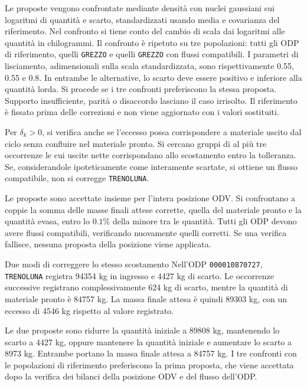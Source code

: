 Le proposte vengono confrontate mediante densità con nuclei gaussiani sui logaritmi di quantità e scarto, standardizzati usando media e covarianza del riferimento. Nel confronto si tiene conto del cambio di scala dai logaritmi alle quantità in chilogrammi. Il confronto è ripetuto su tre popolazioni: tutti gli ODP di riferimento, quelli \texttt{GREZZO} e quelli \texttt{GREZZO} con flussi compatibili. I parametri di lisciamento, adimensionali sulla scala standardizzata, sono rispettivamente \num{0.55}, \num{0.55} e \num{0.8}. In entrambe le alternative, lo scarto deve essere positivo e inferiore alla quantità lorda. Si procede se i tre confronti preferiscono la stessa proposta. Supporto insufficiente, parità o disaccordo lasciano il caso irrisolto. Il riferimento è fissato prima delle correzioni e non viene aggiornato con i valori sostituiti.

Per $\delta_k>0$, si verifica anche se l'eccesso possa corrispondere a materiale uscito dal ciclo senza confluire nel materiale pronto. Si cercano gruppi di al più tre occorrenze le cui uscite nette corrispondano allo scostamento entro la tolleranza. Se, considerandole ipoteticamente come interamente scartate, si ottiene un flusso compatibile, non si corregge \texttt{TRENOLUNA}.

Le proposte sono accettate insieme per l'intera posizione ODV. Si confrontano a coppie la somma delle masse finali attese corrette, quella del materiale pronto e la quantità evasa, entro lo $0.1\%$ della minore tra le quantità. Tutti gli ODP devono avere flussi compatibili, verificando nuovamente quelli corretti. Se una verifica fallisce, nessuna proposta della posizione viene applicata.

\begingroup
{}
\begin{examplebox}{Due modi di correggere lo stesso scostamento}
Nell'ODP \texttt{000010870727}, \texttt{TRENOLUNA} registra \num{94354} kg in ingresso e \num{4427} kg di scarto. Le occorrenze successive registrano complessivamente 624 kg di scarto, mentre la quantità di materiale pronto è \num{84757} kg. La massa finale attesa è quindi \num{89303} kg, con un eccesso di \num{4546} kg rispetto al valore registrato.

Le due proposte sono ridurre la quantità iniziale a \num{89808} kg, mantenendo lo scarto a \num{4427} kg, oppure mantenere la quantità iniziale e aumentare lo scarto a \num{8973} kg. Entrambe portano la massa finale attesa a \num{84757} kg. I tre confronti con le popolazioni di riferimento preferiscono la prima proposta, che viene accettata dopo la verifica dei bilanci della posizione ODV e del flusso dell'ODP.
\end{examplebox}
\endgroup

